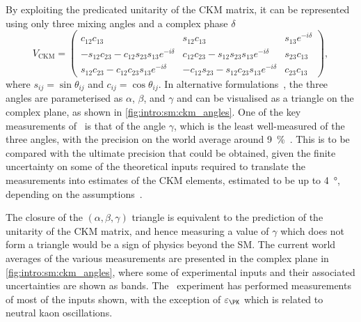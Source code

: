 By exploiting the predicated unitarity of the \ac{CKM} matrix, it can be 
represented using only three mixing angles and a complex phase $\delta$
\begin{equation}
  V_{\textrm{CKM}} =
  \begin{pmatrix}
    c_{12}c_{13} & s_{12}c_{13} & s_{13}e^{-i\delta} \\
    -s_{12}c_{23} - c_{12}s_{23}s_{13}e^{-i\delta} & c_{12}c_{23} - 
    s_{12}s_{23}s_{13}e^{-i\delta} & s_{23}c_{13} \\
    s_{12}c_{23} - c_{12}c_{23}s_{13}e^{-i\delta} & -c_{12}s_{23} - 
    s_{12}c_{23}s_{13}e^{-i\delta} & c_{23}c_{13}
  \end{pmatrix},
\end{equation}
where $s_{ij} = \sin{\theta_{ij}}$ and $c_{ij} = \cos{\theta_{ij}}$.
In alternative formulations~\cite{Wolfenstein:1983yz}, the three angles are 
parameterised as $\alpha$, $\beta$, and $\gamma$ and can be visualised as a 
triangle on the complex plane, as shown in \cref{fig:intro:sm:ckm_angles}.
One of the key measurements of \lhcb\ is that of the angle $\gamma$, which is 
the least well-measured of the three angles, with the precision on the world 
average around \SI{9}{\percent}~\cite{LHCb-CONF-2016-001}.
This is to be compared with the ultimate precision that could be obtained, 
given the finite uncertainty on some of the theoretical inputs required to 
translate the measurements into estimates of the CKM elements, estimated to be 
up to \SI{4}{\degree}, depending on the 
assumptions~\cite{Brod:2013sga,Brod:2014bfa}.

The closure of the $(\alpha, \beta, \gamma)$ triangle is equivalent to the 
prediction of the unitarity of the CKM matrix, and hence measuring a value of 
$\gamma$ which does not form a triangle would be a sign of physics beyond the 
\ac{SM}.
The current world averages of the various measurements are presented in the 
complex plane in \cref{fig:intro:sm:ckm_angles}, where some of experimental 
inputs and their associated uncertainties are shown as bands.
The \lhcb\ experiment has performed measurements of most of the inputs shown, 
with the exception of $\varepsilon_{\PK}$ which is related to neutral kaon 
oscillations.

